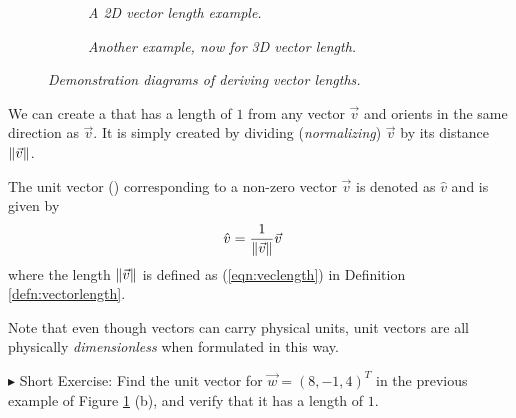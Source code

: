 \begin{figure}[h!]
\centering
\begin{subfigure}{0.7\textwidth}
\centering
{}
\caption{\textit{A 2D vector length example.}}
\end{subfigure}
\begin{subfigure}{0.7\textwidth}
\centering
{}
\caption{\textit{Another example, now for 3D vector length.}}
\end{subfigure}
\caption{\textit{Demonstration diagrams of deriving vector lengths.}}
\label{fig:veclength}
\end{figure}We can create a  that has a length of $1$ from any vector $\vec{v}$ and orients in the same direction as $\vec{v}$. It is simply created by dividing (\textit{normalizing}) $\vec{v}$ by its distance $\norm{\vec{v}}$.
\begin{defn}
\label{defn:unitvec}
The unit vector () corresponding to a non-zero vector $\vec{v}$ is denoted as $\hat{v}$ and is given by
\begin{align}
\hat{v} &= \frac{1}{\norm{\vec{v}}}\vec{v}
\end{align}
where the length $\norm{\vec{v}}$ is defined as (\ref{eqn:veclength}) in Definition \ref{defn:vectorlength}. 
\end{defn}
Note that even though vectors can carry physical units, unit vectors are all physically \textit{dimensionless} when formulated in this way. \par
$\blacktriangleright$ Short Exercise: Find the unit vector for $\vec{w} = (8, -1, 4)^T$ in the previous example of Figure \ref{fig:veclength} (b), and verify that it has a length of $1$.\footnotemark


